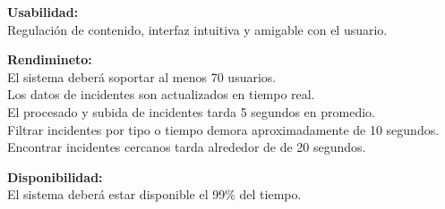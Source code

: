 \begin{itemize}[label=\textcolor{Lotus}{$\triangleright$}]
{        \textbf{Usabilidad:}\\
        Regulación de contenido, interfaz intuitiva y amigable con el usuario. 
        
        \textbf{Rendimineto:}\\
        El sistema deberá soportar al menos 70 usuarios.\\
        Los datos de incidentes son actualizados en tiempo real.\\
        El procesado y subida de incidentes tarda 5 segundos en promedio.\\
        Filtrar incidentes por tipo o tiempo demora aproximadamente de 10 segundos.\\
        Encontrar incidentes cercanos tarda alrededor de de 20 segundos.

        \textbf{Disponibilidad:}\\
        El sistema deberá estar disponible el 99\% del tiempo.
    }
\end{itemize}
